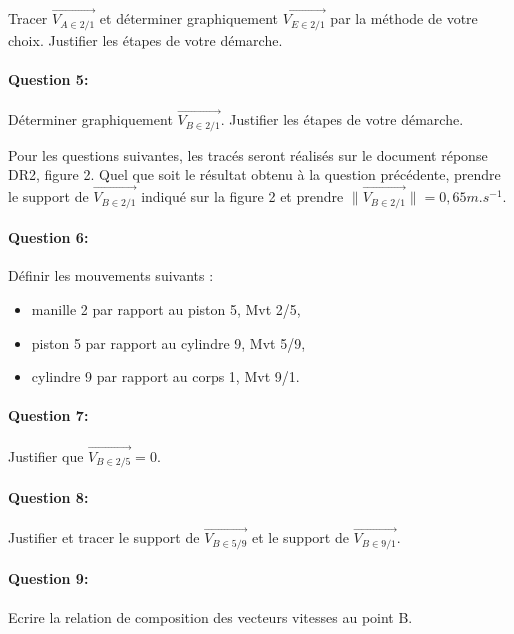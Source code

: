 Tracer $\overrightarrow{V_{A \in 2/1}}$ et déterminer graphiquement $\overrightarrow{V_{E \in 2/1}}$ par la méthode de votre choix. Justifier les étapes de votre démarche.

\paragraph{Question 5:}

Déterminer graphiquement $\overrightarrow{V_{B \in 2/1}}$. Justifier les étapes de votre démarche.

Pour les questions suivantes, les tracés seront réalisés sur le document réponse DR2, figure 2. Quel que soit le résultat obtenu à la question précédente, prendre le support de $\overrightarrow{V_{B \in 2/1}}$ indiqué sur la figure 2 et prendre $\|\overrightarrow{V_{B \in 2/1}}\|=0,65m.s^{-1}$.

\paragraph{Question 6:}

Définir les mouvements suivants :
\begin{itemize}
 \item manille 2 par rapport au piston 5, Mvt 2/5,
 \item piston 5 par rapport au cylindre 9, Mvt 5/9,
 \item cylindre 9 par rapport au corps 1, Mvt 9/1.
\end{itemize}

\paragraph{Question 7:}

Justifier que $\overrightarrow{V_{B \in 2/5}}=0$.

\paragraph{Question 8:}

Justifier et tracer le support de $\overrightarrow{V_{B \in 5/9}}$ et le support de $\overrightarrow{V_{B \in 9/1}}$.

\paragraph{Question 9:}

Ecrire la relation de composition des vecteurs vitesses au point B.

